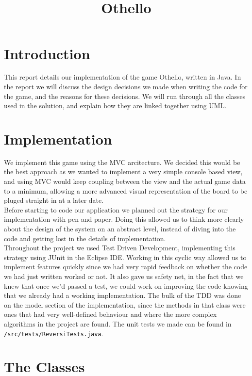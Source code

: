\documentclass[11pt,a4paper,oneside]{report}
\begin{document}
\title{Othello}

\maketitle

\section*{Introduction}
This report details our implementation of the game Othello, written in Java. In the report we will discuss the design decisions we made when writing the code for the game, and the reasons for these decisions. We will run through all the classes used in the solution, and explain how they are linked together using UML.

\section*{Implementation}
We implement this game using the MVC arcitecture. We decided this would be the best approach as we wanted to implement a very simple console based view, and using MVC would keep coupling between the view and the actual game data to a minimum, allowing a more advanced visual representation of the board to be pluged straight in at a later date.\\
\ident Before starting to code our application we planned out the strategy for our implementation with pen and paper. Doing this allowed us to think more clearly about the design of the system on an abstract level, instead of diving into the code and getting lost in the details of implementation.\\
\ident Throughout the project we used Test Driven Development, implementing this strategy using JUnit in the Eclipse IDE. Working in this cyclic way allowed us to implement features quickly since we had very rapid feedback on whether the code we had just written worked or not. It also gave us safety net, in the fact that we knew that once we'd passed a test, we could work on improving the code knowing that we already had a working implementation. The bulk of the TDD was done on the model section of the implementation, since the methods in that class were ones that had very well-defined behaviour and where the more complex algorithms in the project are found. The unit tests we made can be found in \texttt{/src/tests/ReversiTests.java}.

\section*{The Classes}
\end{document}
